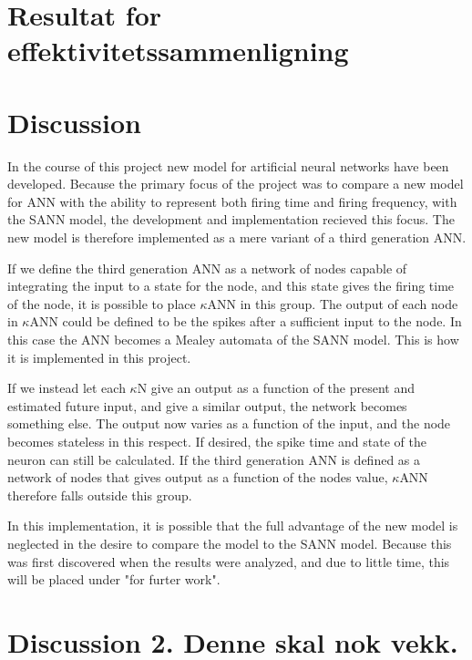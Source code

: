 \section{Resultat for effektivitetssammenligning}



\section{Discussion}
In the course of this project new model for artificial neural networks have been developed. 
Because the primary focus of the project was to compare a new model for ANN with the ability to represent both firing time and firing frequency, with the SANN model, the development and implementation recieved this focus. 
The new model is therefore implemented as a mere variant of a third generation ANN.

If we define the third generation ANN as a network of nodes capable of integrating the input to a state for the node, and this state gives the firing time of the node, it is possible to place $\kappa$ANN in this group.
The output of each node in $\kappa$ANN could be defined to be the spikes after a sufficient input to the node.
In this case the ANN becomes a Mealey automata of the SANN model. This is how it is implemented in this project.

If we instead let each $\kappa$N give an output as a function of the present and estimated future input, and give a similar output, the network becomes something else.
The output now varies as a function of the input, and the node becomes stateless in this respect. If desired, the spike time and state of the neuron can still be calculated. 
If the third generation ANN is defined as a network of nodes that gives output as a function of the nodes value, $\kappa$ANN therefore falls outside this group.

In this implementation, it is possible that the full advantage of the new model is neglected in the desire to compare the model to the SANN model.
Because this was first discovered when the results were analyzed, and due to little time, this will be placed under "for furter work". %




\section{Discussion 2. Denne skal nok vekk.}

